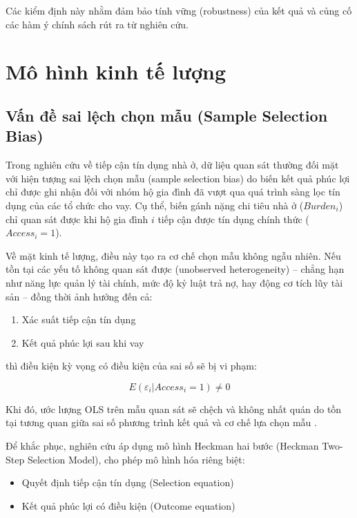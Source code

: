 \documentclass[12pt,a4paper]{report}
\begin{document}
	Các kiểm định này nhằm đảm bảo tính vững (robustness) của kết quả và củng cố các hàm ý chính sách rút ra từ nghiên cứu.

\section{Mô hình kinh tế lượng}

\subsection{Vấn đề sai lệch chọn mẫu (Sample Selection Bias)}

Trong nghiên cứu về tiếp cận tín dụng nhà ở, dữ liệu quan sát thường đối mặt với hiện tượng sai lệch chọn mẫu (sample selection bias) do biến kết quả phúc lợi chỉ được ghi nhận đối với nhóm hộ gia đình đã vượt qua quá trình sàng lọc tín dụng của các tổ chức cho vay. Cụ thể, biến gánh nặng chi tiêu nhà ở ($Burden_i$) chỉ quan sát được khi hộ gia đình $i$ tiếp cận được tín dụng chính thức ($Access_i = 1$).

Về mặt kinh tế lượng, điều này tạo ra cơ chế chọn mẫu không ngẫu nhiên. Nếu tồn tại các yếu tố không quan sát được (unobserved heterogeneity) -- chẳng hạn như năng lực quản lý tài chính, mức độ kỷ luật trả nợ, hay động cơ tích lũy tài sản -- đồng thời ảnh hưởng đến cả:

\begin{enumerate}
	\item Xác suất tiếp cận tín dụng
	\item Kết quả phúc lợi sau khi vay
\end{enumerate}

thì điều kiện kỳ vọng có điều kiện của sai số sẽ bị vi phạm:

\begin{equation}
	E(\varepsilon_i | Access_i = 1) \neq 0
\end{equation}

Khi đó, ước lượng OLS trên mẫu quan sát sẽ chệch và không nhất quán do tồn tại tương quan giữa sai số phương trình kết quả và cơ chế lựa chọn mẫu \parencite{Heckman1979}.

Để khắc phục, nghiên cứu áp dụng mô hình Heckman hai bước (Heckman Two-Step Selection Model), cho phép mô hình hóa riêng biệt:

\begin{itemize}
	\item Quyết định tiếp cận tín dụng (Selection equation)
	\item Kết quả phúc lợi có điều kiện (Outcome equation)
\end{itemize}
\end{document}
